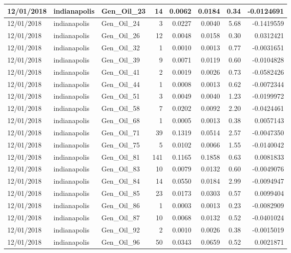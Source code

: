 \documentclass[
  letterpaper,
  DIV=11,
  numbers=noendperiod]{scrartcl}
\begin{document}
\begin{tabular}{l|l|l|r|r|r|r|r}
\hline
12/01/2018 & indianapolis & Gen\_Oil\_23 & 14 & 0.0062 & 0.0184 & 0.34 & -0.0124691\\
\hline
12/01/2018 & indianapolis & Gen\_Oil\_24 & 3 & 0.0227 & 0.0040 & 5.68 & -0.1419559\\
\hline
12/01/2018 & indianapolis & Gen\_Oil\_26 & 12 & 0.0048 & 0.0158 & 0.30 & 0.0312421\\
\hline
12/01/2018 & indianapolis & Gen\_Oil\_32 & 1 & 0.0010 & 0.0013 & 0.77 & -0.0031651\\
\hline
12/01/2018 & indianapolis & Gen\_Oil\_39 & 9 & 0.0071 & 0.0119 & 0.60 & -0.0104828\\
\hline
12/01/2018 & indianapolis & Gen\_Oil\_41 & 2 & 0.0019 & 0.0026 & 0.73 & -0.0582426\\
\hline
12/01/2018 & indianapolis & Gen\_Oil\_44 & 1 & 0.0008 & 0.0013 & 0.62 & -0.0072344\\
\hline
12/01/2018 & indianapolis & Gen\_Oil\_51 & 3 & 0.0049 & 0.0040 & 1.23 & -0.0199972\\
\hline
12/01/2018 & indianapolis & Gen\_Oil\_58 & 7 & 0.0202 & 0.0092 & 2.20 & -0.0424461\\
\hline
12/01/2018 & indianapolis & Gen\_Oil\_68 & 1 & 0.0005 & 0.0013 & 0.38 & 0.0057143\\
\hline
12/01/2018 & indianapolis & Gen\_Oil\_71 & 39 & 0.1319 & 0.0514 & 2.57 & -0.0047350\\
\hline
12/01/2018 & indianapolis & Gen\_Oil\_75 & 5 & 0.0102 & 0.0066 & 1.55 & -0.0140042\\
\hline
12/01/2018 & indianapolis & Gen\_Oil\_81 & 141 & 0.1165 & 0.1858 & 0.63 & 0.0081833\\
\hline
12/01/2018 & indianapolis & Gen\_Oil\_83 & 10 & 0.0079 & 0.0132 & 0.60 & -0.0049076\\
\hline
12/01/2018 & indianapolis & Gen\_Oil\_84 & 14 & 0.0550 & 0.0184 & 2.99 & -0.0094947\\
\hline
12/01/2018 & indianapolis & Gen\_Oil\_85 & 23 & 0.0173 & 0.0303 & 0.57 & 0.0099404\\
\hline
12/01/2018 & indianapolis & Gen\_Oil\_86 & 1 & 0.0003 & 0.0013 & 0.23 & -0.0082909\\
\hline
12/01/2018 & indianapolis & Gen\_Oil\_87 & 10 & 0.0068 & 0.0132 & 0.52 & -0.0401024\\
\hline
12/01/2018 & indianapolis & Gen\_Oil\_92 & 2 & 0.0010 & 0.0026 & 0.38 & -0.0015019\\
\hline
12/01/2018 & indianapolis & Gen\_Oil\_96 & 50 & 0.0343 & 0.0659 & 0.52 & 0.0021871\\

\end{tabular}
\end{document}
